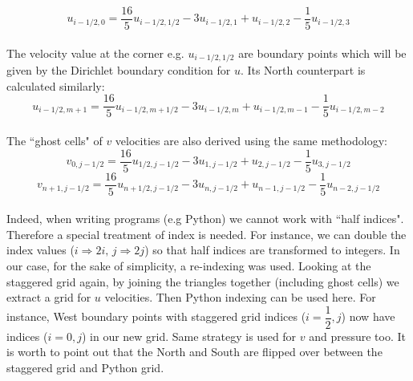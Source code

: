 \begin{equation}
u_{i-1/2,0} = \dfrac{16}{5} u_{i-1/2,1/2} - 3 u_{i-1/2,1} + u_{i-1/2,2} - \dfrac{1}{5}u_{i-1/2,3}
\end{equation}\\
The velocity value at the corner e.g. $u_{i-1/2,1/2}$ are boundary points which will be given by the Dirichlet boundary condition for $u$. Its North counterpart is calculated similarly:\\
\begin{equation}
u_{i-1/2,m+1} = \dfrac{16}{5} u_{i-1/2,m+1/2} - 3 u_{i-1/2,m} + u_{i-1/2,m-1} - \dfrac{1}{5}u_{i-1/2,m-2}
\end{equation}\\
The ``ghost cells" of $v$ velocities are also derived using the same methodology:\\
\begin{equation}
v_{0,j-1/2} = \dfrac{16}{5} u_{1/2,j-1/2} - 3 u_{1,j-1/2} + u_{2,j-1/2} - \dfrac{1}{5}u_{3,j-1/2}
\end{equation}
\begin{equation}
v_{n+1,j-1/2} = \dfrac{16}{5} u_{n+1/2,j-1/2} - 3 u_{n,j-1/2} + u_{n-1,j-1/2} - \dfrac{1}{5}u_{n-2,j-1/2}
\end{equation}\\
Indeed, when writing programs (e.g Python) we cannot work with ``half indices". Therefore a special treatment of index is needed. For instance, we can double the index values ($i \Rightarrow 2i,\,j \Rightarrow 2j$) so that half indices are transformed to integers. In our case, for the sake of simplicity, a re-indexing was used. Looking at the staggered grid again, by joining the triangles together (including ghost cells) we extract a grid for $u$ velocities. Then Python indexing can be used here. For instance, West boundary points with staggered grid indices ($i=\dfrac{1}{2},j$) now have indices ($i=0,j$) in our new grid. Same strategy is used for $v$ and pressure too. It is worth to point out that the North and South are flipped over between the staggered grid and Python grid.

